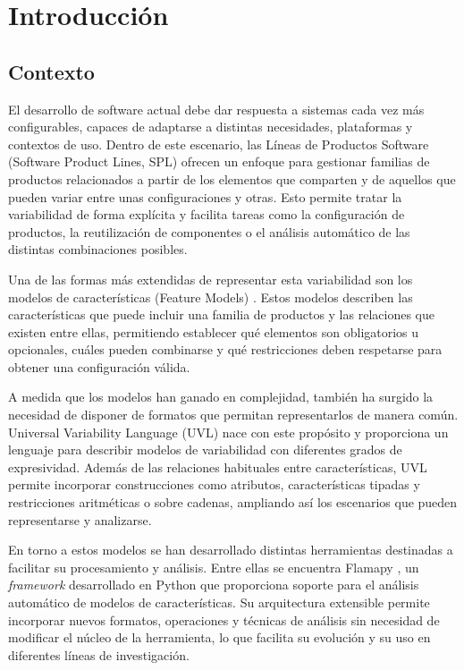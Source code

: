 \chapter{Introducción}
\label{chap:intro}



\section{Contexto}
\label{sec:contexto}



El desarrollo de software actual debe dar respuesta a sistemas cada vez más configurables, capaces de adaptarse a distintas necesidades, plataformas y contextos de uso. Dentro de este escenario, las Líneas de Productos Software (Software Product Lines, SPL) \cite{spl} ofrecen un enfoque para gestionar familias de productos relacionados a partir de los elementos que comparten y de aquellos que pueden variar entre unas configuraciones y otras. Esto permite tratar la variabilidad de forma explícita y facilita tareas como la configuración de productos, la reutilización de componentes o el análisis automático de las distintas combinaciones posibles.

Una de las formas más extendidas de representar esta variabilidad son los modelos de características (Feature Models) \cite{featureModels}. Estos modelos describen las características que puede incluir una familia de productos y las relaciones que existen entre ellas, permitiendo establecer qué elementos son obligatorios u opcionales, cuáles pueden combinarse y qué restricciones deben respetarse para obtener una configuración válida.

A medida que los modelos han ganado en complejidad, también ha surgido la necesidad de disponer de formatos que permitan representarlos de manera común. Universal Variability Language (UVL) \cite{uvl} nace con este propósito y proporciona un lenguaje para describir modelos de variabilidad con diferentes grados de expresividad. Además de las relaciones habituales entre características, UVL permite incorporar construcciones como atributos, características tipadas y restricciones
aritméticas o sobre cadenas, ampliando así los escenarios que pueden representarse y analizarse.

En torno a estos modelos se han desarrollado distintas herramientas destinadas a facilitar su procesamiento y análisis. Entre ellas se encuentra Flamapy \cite{flama2023}, un \textit{framework} desarrollado en Python que proporciona soporte para el análisis automático de modelos de características. Su arquitectura extensible permite incorporar nuevos formatos, operaciones y técnicas de análisis sin necesidad de modificar el núcleo de la herramienta, lo que facilita su evolución y su uso en diferentes líneas de investigación.

